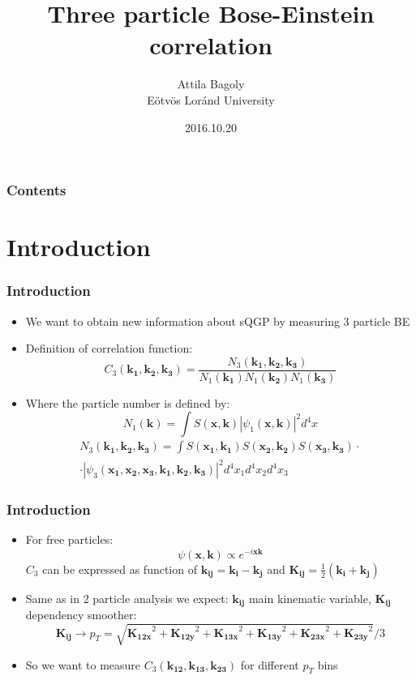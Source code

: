 \documentclass{beamer}
\title[HBT]{Three particle Bose-Einstein correlation}
\author[Attila Bagoly]{Attila Bagoly\\ Eötvös Loránd University \vspace{0.5cm}}
\date[2016.10.20.]{2016.10.20}
\institute[ELTE]{
\large{Supervisor: Máté Csanád}
}
\begin{document}
\begin{frame}
  \titlepage
\end{frame}

\begin{frame}
\frametitle{Contents}
\tableofcontents
\end{frame}


\section{Introduction}
\begin{frame}
\frametitle{Introduction}
\begin{itemize}
\setlength{\itemsep}{12pt}
\item We want to obtain new information about sQGP by measuring 3 particle BE
\item Definition of correlation function:
\begin{equation}
C_3(\bm{k_1}, \bm{k_2}, \bm{k_3})=\frac{N_3(\bm{k_1}, \bm{k_2}, \bm{k_3})}{N_1(\bm{k_1})N_1(\bm{k_2})N_1(\bm{k_3})} \label{eq:e1}
\end{equation}
\item Where the particle number is defined by:
\begin{equation}
N_1(\bm{k})=\int S(\bm{x}, \bm{k})|\psi_1(\bm{x}, \bm{k})|^2 d^4x \label{eq:e2}
\end{equation}
\begin{align}
N_3(\bm{k_1}, \bm{k_2}, \bm{k_3})=\int S(\bm{x_1}, \bm{k_1})S(\bm{x_2}, \bm{k_2})S(\bm{x_3}, \bm{k_3})\nonumber\cdot\\\cdot|\psi_3(\bm{x_1},\bm{x_2},\bm{x_3}, \bm{k_1},\bm{k_2},\bm{k_3})|^2 d^4x_1d^4x_2d^4x_3\label{eq:e3}
\end{align}
\end{itemize}
\end{frame}

\begin{frame}
\frametitle{Introduction}
\begin{itemize}
\setlength{\itemsep}{12pt}
\item For free particles:
\begin{equation}
\psi(\bm{x}, \bm{k})\propto e^{-i\bm{x}\bm{k}}
\end{equation}
 $C_3$ can be expressed as function of $\bm{k_{ij}}=\bm{k_i}-\bm{k_j}$ and $\bm{K_{ij}}=\frac{1}{2}(\bm{k_i}+\bm{k_j})$
\item Same as in 2 particle analysis we expect: $\bm{k_{ij}}$ main kinematic variable, $\bm{K_{ij}}$ dependency smoother:
\begin{equation*}
\bm{K_{ij}} \rightarrow p_T=\sqrt{\bm{K_{12x}}^2+\bm{K_{12y}}^2+\bm{K_{13x}}^2+\bm{K_{13y}}^2+\bm{K_{23x}}^2+\bm{K_{23y}}^2}/3
\end{equation*}
\item So we want to measure $C_3(\bm{k_{12}}, \bm{k_{13}}, \bm{k_{23}})$ for different $p_T$ bins
\end{itemize}
\end{frame}
\end{document}
